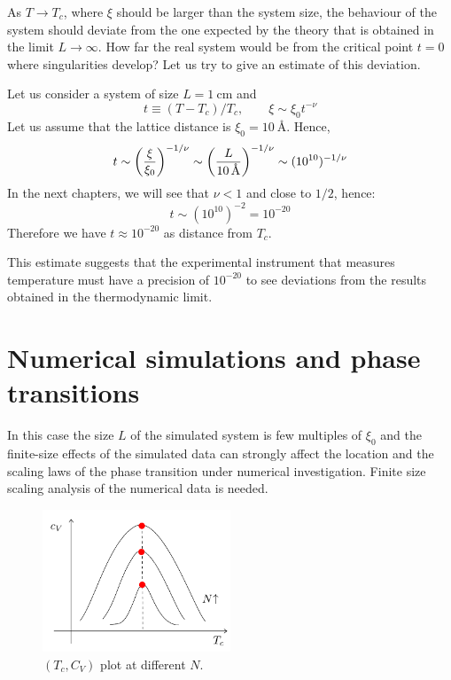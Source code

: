 \documentclass[../main/main.tex]{subfiles}
\begin{document}
As \( T \rightarrow T_c \), where \( \xi  \) should be larger than the system size, the behaviour of the system should deviate from the one expected by the theory that is obtained in the limit \( L \rightarrow \infty  \). How far the real system would be from the critical point \( t=0 \) where singularities develop? Let us try to give an estimate of this deviation.

 Let us consider a system of size \( L = \SI{1}{\cm}  \) and
\begin{equation*}
  t \equiv (T-T_c)/T_c, \qquad \xi \sim \xi _0 t^{-\nu }
\end{equation*}
Let us assume that the lattice distance is \( \xi _0 = \SI{10}{\angstrom}  \). Hence,
 \begin{equation}
   t \sim \qty(\frac{\xi }{\xi _0})^{-1/\nu } \sim \qty(\frac{L}{\SI{10}{\angstrom} })^{-1/\nu } \sim (10^{10})^{-1/\nu }
 \end{equation}
In the next chapters, we will see that \( \nu < 1 \) and close to \( 1/2 \), hence:
\begin{equation}
  t \sim (10^{10})^{-2 } = 10^{-20}
\end{equation}
Therefore we have \( t \approx 10^{-20} \)  as distance from \( T_c \).

This estimate suggests that the experimental instrument that measures temperature must have a precision of \( 10^{-20} \)  to see deviations from the results obtained in the thermodynamic limit.


\clearpage

\section{Numerical simulations and phase transitions}

In this case the size \( L \) of the simulated system is few multiples of \( \xi _0 \) and the finite-size effects of the simulated data can strongly affect the location and the scaling laws of the phase transition under numerical investigation.
Finite size scaling analysis of the numerical data is needed.

\begin{figure}[h!]
\centering
\includegraphics[width=0.5\textwidth]{../lessons/5_image/2.pdf}
\caption{\label{fig:5_2} \( (T_c,C_V) \) plot at different \( N \).}
\end{figure}
\end{document}
